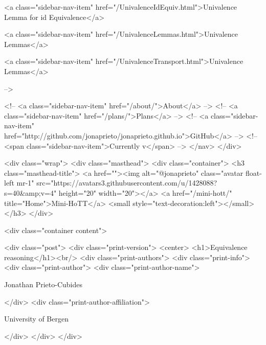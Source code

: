       
    
      
        
          <a class="sidebar-nav-item" href="/UnivalenceIdEquiv.html">Univalence Lemma for id Equivalence</a>
        
      
    
      
        
          <a class="sidebar-nav-item" href="/UnivalenceLemmas.html">Univalence Lemmas</a>
        
      
    
      
        
          <a class="sidebar-nav-item" href="/UnivalenceTransport.html">Univalence Lemmas</a>
        
      
     -->

    <!-- <a class="sidebar-nav-item" href="/about/">About</a> -->
    <!-- <a class="sidebar-nav-item" href="/plans/">Plans</a> -->
    <!-- <a class="sidebar-nav-item" href="http://github.com/jonaprieto/jonaprieto.github.io">GitHub</a> -->
    <!-- <span class="sidebar-nav-item">Currently v</span> -->
  </nav>
</div>

    <div class="wrap">
      <div class="masthead">
        <div class="container">
          <h3 class="masthead-title">
            <a href=""><img alt="@jonaprieto" class="avatar float-left mr-1" src="https://avatars3.githubusercontent.com/u/1428088?s=40&amp;v=4" height="20" width="20"></a>
            <a href="/mini-hott/" title="Home">Mini-HoTT</a>
            <small style="text-decoration:left"></small>
          </h3>
        </div>
      
      <div class="container content">
        







<div class="post">
  <div class="print-version">
    <center>
      <h1>Equivalence reasoning</h1><br/>
        <div class="print-authors">
          <div class="print-info">
            <div class="print-author">
              <div class="print-author-name">
                
                  Jonathan Prieto-Cubides
                
              </div>
              <div class="print-author-affiliation">
                
                  University of Bergen
                
                </div>
            </div>
          </div>
          
